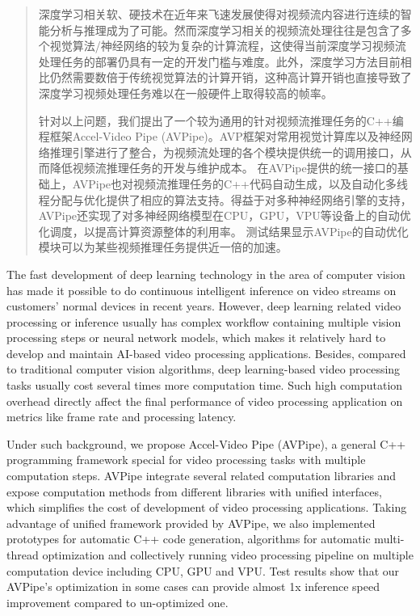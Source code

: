 
\begin{abstract}
深度学习相关软、硬技术在近年来飞速发展使得对视频流内容进行连续的智能分析与推理成为了可能。然而深度学习相关的视频流处理往往是包含了多个视觉算法/神经网络的较为复杂的计算流程，这使得当前深度学习视频流处理任务的部署仍具有一定的开发门槛与难度。此外，深度学习方法目前相比仍然需要数倍于传统视觉算法的计算开销，这种高计算开销也直接导致了深度学习视频处理任务难以在一般硬件上取得较高的帧率。\par
针对以上问题，我们提出了一个较为通用的针对视频流推理任务的C++编程框架Accel-Video Pipe (AVPipe)。AVP框架对常用视觉计算库以及神经网络推理引擎进行了整合，为视频流处理的各个模块提供统一的调用接口，从而降低视频流推理任务的开发与维护成本。
在AVPipe提供的统一接口的基础上，AVPipe也对视频流推理任务的C++代码自动生成，以及自动化多线程分配与优化提供了相应的算法支持。得益于对多种神经网络引擎的支持，AVPipe还实现了对多神经网络模型在CPU，GPU，VPU等设备上的自动优化调度，以提高计算资源整体的利用率。%
测试结果显示AVPipe的自动优化模块可以为某些视频推理任务提供近一倍的加速。
\end{abstract}

\begin{enabstract}
The fast development of deep learning technology in the area of computer vision has made it possible to do continuous intelligent inference on video streams on customers' normal devices in recent years. 
However, deep learning related video processing or inference usually has complex workflow containing multiple vision processing steps or neural network models, which makes it relatively hard to develop and maintain AI-based video processing applications. Besides, compared to traditional computer vision algorithms, deep learning-based video processing tasks usually cost several times more computation time. Such high computation overhead directly affect the final performance of video processing application on metrics like frame rate and processing latency.\par
Under such background, we propose Accel-Video Pipe (AVPipe), a general C++ programming framework special for video processing tasks with multiple computation steps. AVPipe integrate several related computation libraries and expose computation methods from different libraries with unified interfaces, which simplifies the cost of development of video processing applications. Taking advantage of unified framework provided by AVPipe, we also implemented prototypes for automatic C++ code generation, algorithms for automatic multi-thread optimization and collectively running video processing pipeline on multiple computation device including CPU, GPU and VPU. 
Test results show that our AVPipe's optimization in some cases can provide almost 1x inference speed improvement compared to un-optimized one.
\end{enabstract}
